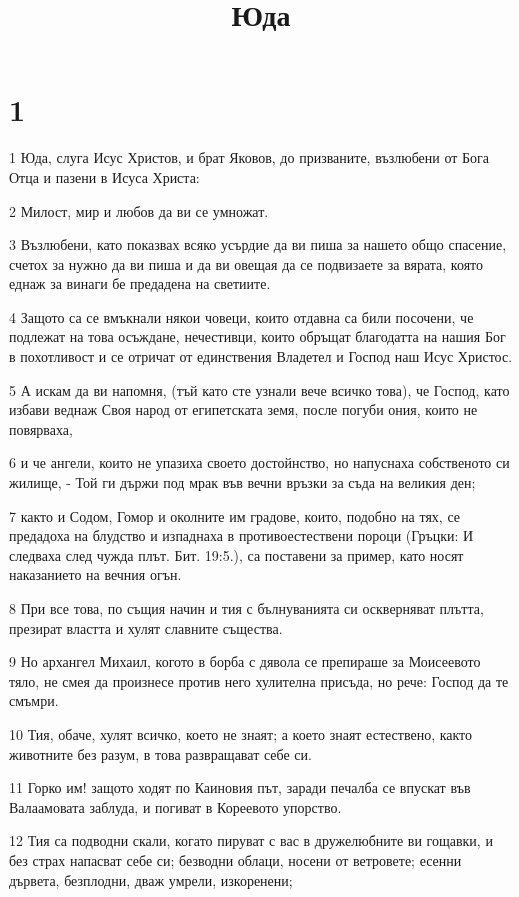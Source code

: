 

\title{Юда}


\chapter{1}

\par 1 Юда, слуга Исус Христов, и брат Яковов, до призваните, възлюбени от Бога Отца и пазени в Исуса Христа:
\par 2 Милост, мир и любов да ви се умножат.
\par 3 Възлюбени, като показвах всяко усърдие да ви пиша за нашето общо спасение, счетох за нужно да ви пиша и да ви овещая да се подвизаете за вярата, която еднаж за винаги бе предадена на светиите.
\par 4 Защото са се вмъкнали някои човеци, които отдавна са били посочени, че подлежат на това осъждане, нечестивци, които обръщат благодатта на нашия Бог в похотливост и се отричат от единствения Владетел и Господ наш Исус Христос.
\par 5 А искам да ви напомня, (тъй като сте узнали вече всичко това), че Господ, като избави веднаж Своя народ от египетската земя, после погуби ония, които не повярваха,
\par 6 и че ангели, които не упазиха своето достойнство, но напуснаха собственото си жилище, - Той ги държи под мрак във вечни връзки за съда на великия ден;
\par 7 както и Содом, Гомор и околните им градове, които, подобно на тях, се предадоха на блудство и изпаднаха в противоестествени пороци (Гръцки: И следваха след чужда плът. Бит. 19:5.), са поставени за пример, като носят наказанието на вечния огън.
\par 8 При все това, по същия начин и тия с бълнуванията си оскверняват плътта, презират властта и хулят славните същества.
\par 9 Но архангел Михаил, когото в борба с дявола се препираше за Моисеевото тяло, не смея да произнесе против него хулителна присъда, но рече: Господ да те смъмри.
\par 10 Тия, обаче, хулят всичко, което не знаят; а което знаят естествено, както животните без разум, в това развращават себе си.
\par 11 Горко им! защото ходят по Каиновия път, заради печалба се впускат във Валаамовата заблуда, и погиват в Кореевото упорство.
\par 12 Тия са подводни скали, когато пируват с вас в дружелюбните ви гощавки, и без страх напасват себе си; безводни облаци, носени от ветровете; есенни дървета, безплодни, дваж умрели, изкоренени;
